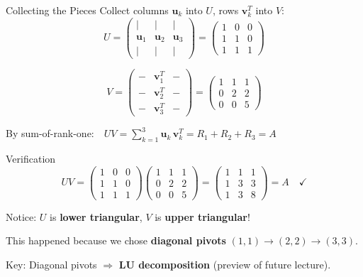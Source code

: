 \documentclass[10pt]{beamer}
\theoremstyle{definition}
\newcommand{\x}[1]{\alert{\textbf{#1}}}
\begin{document}
\begin{frame}{Collecting the Pieces}
Collect columns $\mathbf{u}_k$ into $U$, rows $\mathbf{v}_k^T$ into $V$:
$$U = \begin{pmatrix}
| & | & | \\
\mathbf{u}_1 & \mathbf{u}_2 & \mathbf{u}_3 \\
| & | & |
\end{pmatrix}
= \begin{pmatrix}
1 & 0 & 0 \\
1 & 1 & 0 \\
1 & 1 & 1
\end{pmatrix}$$

$$V = \begin{pmatrix}
- & \mathbf{v}_1^T & - \\
- & \mathbf{v}_2^T & - \\
- & \mathbf{v}_3^T & -
\end{pmatrix}
= \begin{pmatrix}
1 & 1 & 1 \\
0 & 2 & 2 \\
0 & 0 & 5
\end{pmatrix}$$

By sum-of-rank-one:\ \ $UV = \sum_{k=1}^{3} \mathbf{u}_k\, \mathbf{v}_k^T = R_1 + R_2 + R_3 = A$
\end{frame}

\begin{frame}{Verification}
$$UV = \begin{pmatrix}
1 & 0 & 0 \\
1 & 1 & 0 \\
1 & 1 & 1
\end{pmatrix}
\begin{pmatrix}
1 & 1 & 1 \\
0 & 2 & 2 \\
0 & 0 & 5
\end{pmatrix}
= \begin{pmatrix}
1 & 1 & 1 \\
1 & 3 & 3 \\
1 & 3 & 8
\end{pmatrix} = A \quad \checkmark$$

\vfill
Notice: $U$ is \x{lower triangular}, $V$ is \x{upper triangular}!

\vfill
This happened because we chose \x{diagonal pivots} $(1,1) \to (2,2) \to (3,3)$.

\vfill
Key: Diagonal pivots $\Longrightarrow$ \x{LU decomposition} (preview of future lecture).
\end{frame}
\end{document}
